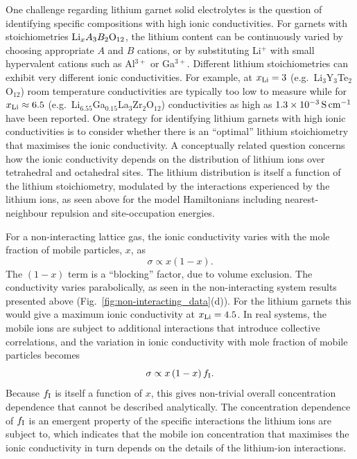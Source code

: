\documentclass[aps,prb,twocolumn,superscriptaddress,reprint]{revtex4-1}
\newcommand{\xLi}{x_\m{Li}}
\begin{document}
One challenge regarding lithium garnet solid electrolytes is the question of identifying specific compositions with high ionic conductivities. For garnets with stoichiometries $\mathrm{Li}_xA_3B_2\mathrm{O}_{12}$, the lithium content can be continuously varied by choosing appropriate $A$ and $B$ cations, or by substituting Li$^+$ with small hypervalent cations such as Al$^{3+}$ or Ga$^{3+}$. Different lithium stoichiometries can exhibit very different ionic conductivities. For example, at $\xLi=3$ (e.g.\ Li$_3$Y$_3$Te$_2$O$_{12}$) room temperature conductivities are typically too low to measure\cite{OCallaghanEtAl_ChemMater2006,BachmanEtAl_ChemRev2016,ThangaduraiEtAl_JPhysChemLett2015} 
while for $\xLi\approx6.5$ (e.g.\ Li$_{6.55}$Ga$_{0.15}$La$_3$Zr$_2$O$_{12}$) conductivities as high as $1.3\times10^{-3}\,\mathrm{S}\,\mathrm{cm}^{-1}$ have been reported.\cite{Bernuy-LopezEtAl_ChemMater2014,RettenwanderEtAl_InorgChem2014} One strategy for identifying lithium garnets with high ionic conductivities is to consider whether there is an ``optimal'' lithium stoichiometry that maximises the ionic conductivity.\cite{MuruganEtAl_JElectrochemSoc2008,MuruganEtAl_Ionics2007,RamakumarEtAl_DaltonTrans2015,MiaraEtAl_ChemMater2013,XieEtAl_ChemMater2011,MuruganEtAl_MaterSciEngB2007,OCallaghanAndCussen_ChemComm2007,XuEtAl_PhysRevB2012,ChenEtAl_SciRep2017} A conceptually related question concerns how the ionic conductivity depends on the distribution of lithium ions over tetrahedral and octahedral sites.\cite{ChenEtAl_ChemMater2015,ThangaduraiEtAl_JAmCeramSoc2003,MuruganEtAl_MaterSciEngB2007,OCallaghanAndCussen_ChemComm2007} The lithium distribution is itself a function of the lithium stoichiometry, modulated by the interactions experienced by the lithium ions, as seen above for the model Hamiltonians including nearest-neighbour repulsion and site-occupation energies.
 
For a non-interacting lattice gas, the ionic conductivity varies with the mole fraction of mobile particles, $x$, as
\begin{equation}
  \sigma \propto x \left(1-x\right).
\end{equation}
The $(1-x)$ term is a ``blocking'' factor, due to volume exclusion.\cite{Kutner_PhysLett1981} The conductivity varies parabolically, as seen in the non-interacting system results presented above (Fig.\ \ref{fig:non-interacting_data}(d)). For the lithium garnets this would give a maximum ionic conductivity at $\xLi=4.5$. In real systems, the mobile ions are subject to additional interactions that introduce collective correlations, and the variation in ionic conductivity with mole fraction of mobile particles becomes
\begin{equation}
  \sigma \propto x \left(1-x\right)f_{\mathrm{I}}.
  \label{eqn:sigma_conc_dependence}
\end{equation}
Because $f_{\mathrm{I}}$ is itself a function of $x$, this gives non-trivial overall concentration dependence that cannot be described analytically. The concentration dependence of $f_{\mathrm{I}}$ is an emergent property of the specific interactions the lithium ions are subject to, which indicates that the mobile ion concentration that maximises the ionic conductivity in turn depends on the details of the lithium-ion interactions. 
\end{document}

